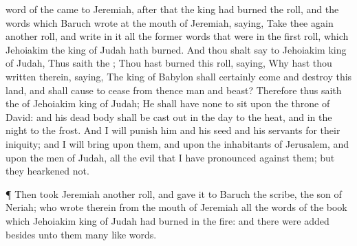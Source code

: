 {word of the
{} came to
Jeremiah,
after that the
king had
burned the
roll, and the
words which
Baruch
wrote at the
mouth of
Jeremiah,
saying,
Take thee
again
another
roll, and
write in it all the
former
words that were in the
first
roll, which
Jehoiakim the
king of
Judah hath
burned.
And thou shalt
say to
Jehoiakim
king of
Judah, Thus
saith the
{}; Thou hast
burned this
roll,
saying, Why hast thou
written therein,
saying, The
king of
Babylon shall
certainly
come and
destroy this
land, and shall cause to
cease from thence
man and
beast?
Therefore thus
saith the
{} of
Jehoiakim
king of
Judah; He shall have none to
sit upon the
throne of
David: and his dead
body shall be cast
out in the
day to the
heat, and in the
night to the
frost.
And I will
punish him and his
seed and his
servants for their
iniquity; and I will
bring upon them, and upon the
inhabitants of
Jerusalem, and upon the
men of
Judah, all the
evil that I have
pronounced against them; but they
hearkened not.
\par }{\PP {}¶ Then
took
Jeremiah
another
roll, and
gave it to
Baruch the
scribe, the
son of
Neriah; who
wrote therein from the
mouth of
Jeremiah all the
words of the
book which
Jehoiakim
king of
Judah had
burned in the
fire: and there were
added besides unto them
many
like
words.

}
